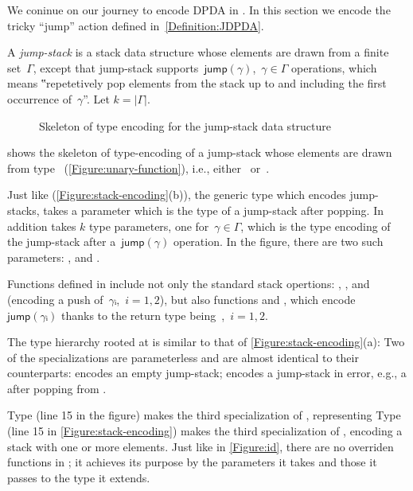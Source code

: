 We coninue on our journey to encode DPDA in \Java.
In this section we encode the tricky ``jump'' action defined in~\cref{Definition:JDPDA}.

A \emph{jump-stack} is a stack data structure whose elements are drawn from a finite set~$Γ$,
  except that jump-stack supports~$\textsf{jump}(γ)$,~$γ∈Γ$ operations,
    which means
  ‟repetetively pop elements from the stack up to and including the first occurrence of~$γ$”.
Let $k=|\Gamma|$. 

\begin{wrapfigure}[16]{r}{42ex}
  \caption{Skeleton of type encoding for the jump-stack data structure}%
  \label{Figure:jump}%
  \lstset{style=numbered}
\end{wrapfigure}

 shows the skeleton of type-encoding of a jump-stack whose
elements are drawn from type~
(\cref{Figure:unary-function}), i.e., either~ or~.

Just like  (\cref{Figure:stack-encoding}(b)),
  the generic type  which encodes jump-stacks, takes
  a  parameter which is the type of a jump-stack after popping.
In addition  takes $k$ type parameters, one for~$γ∈Γ$,
  which is the type encoding of the jump-stack after a~$\textsf{jump}(γ)$
  operation.
In the figure, there are two such parameters: , and
  .

Functions defined in  include not only the standard stack opertions: ,
,  and~ (encoding a push of~$γᵢ$,~$i=1,2$),
  but also functions  and ,
  which encode~$\textsf{jump}(γᵢ)$
  thanks to the return type being~,~$i=1,2$.

The type hierarchy rooted at  is similar to that of
\cref{Figure:stack-encoding}(a):
  Two of the specializations are parameterless and are
  almost identical to their 
  counterparts:
 encodes an empty jump-stack;  encodes a jump-stack in error,
e.g., a after popping from .


Type  (line 15 in the figure) makes  the third specialization of , representing 
Type  (line 15 in \cref{Figure:stack-encoding}) makes  the third specialization of , encoding 
  a stack with one or more elements.
Just like in \cref{Figure:id}, there are no overriden functions in ; it achieves
  its purpose by the parameters it takes and those it passes
  to the type it extends.

